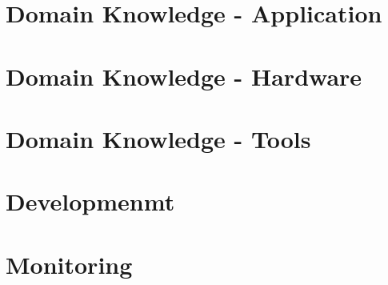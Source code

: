 \documentclass[10pt,a4paper,bibliography=totoc]{scrbook}
\begin{document}
    
   

\tableofcontents
\newpage

\listoffigures
\newpage

\listofcodes
\cleardoublepage

%

\newpage


  
  
  
\part{Domain Knowledge - Application}  

  

\part{Domain Knowledge - Hardware}  

  

  

  

\part{Domain Knowledge - Tools}  

  

  


\part{Developmenmt}

  



\part{Monitoring}
\end{document}
